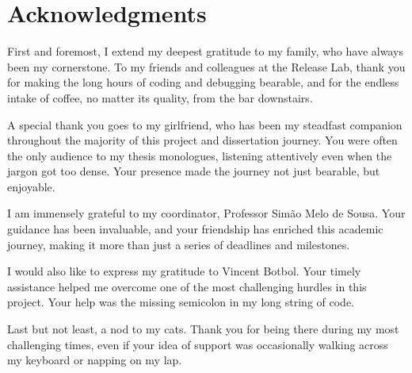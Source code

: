 \chapter*{Acknowledgments}

First and foremost, I extend my deepest gratitude to my family, who have always been my cornerstone. To my friends and colleagues at the Release Lab, thank you for making the long hours of coding and debugging bearable, and for the endless intake of coffee, no matter its quality, from the bar downstairs.

A special thank you goes to my girlfriend, who has been my steadfast companion throughout the majority of this project and dissertation journey. You were often the only audience to my thesis monologues, listening attentively even when the jargon got too dense. Your presence made the journey not just bearable, but enjoyable.

I am immensely grateful to my coordinator, Professor Simão Melo de Sousa. Your guidance has been invaluable, and your friendship has enriched this academic journey, making it more than just a series of deadlines and milestones.

I would also like to express my gratitude to Vincent Botbol. Your timely assistance helped me overcome one of the most challenging hurdles in this project. Your help was the missing semicolon in my long string of code.

Last but not least, a nod to my cats. Thank you for being there during my most challenging times, even if your idea of support was occasionally walking across my keyboard or napping on my lap.
